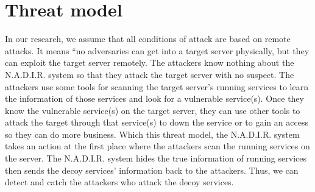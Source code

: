 \section{Threat model}
\label{threat_model}

In our research, we assume that all conditions of attack are based on remote attacks. It means “no adversaries can get into a target server physically, but they can exploit the target server remotely. The attackers know nothing about the N.A.D.I.R. system so that they attack the target server with no suspect. The attackers use some tools for scanning the target server's running services to learn the information of those services and look for a vulnerable service(s). Once they know the vulnerable service(s) on the target server, they can use other tools to attack the target through that service(s) to down the service or to gain an access so they can do more business. Which this threat model, the N.A.D.I.R. system takes an action at the first place where the attackers scan the running services on the server. The N.A.D.I.R. system hides the true information of running services then sends the decoy services' information back to the attackers. Thus, we can detect and catch the attackers who attack the decoy services.
